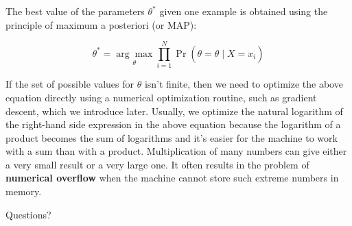 \documentclass[9pt,dvipsnames]{beamer}
\begin{document}
\begin{frame}
	The best value of the parameters $\theta^{*}$ given one example is obtained using the principle of maximum a posteriori (or MAP):

	$$
		\theta^{*}=\underset{\theta}{\arg \max } \prod_{i=1}^{N} \operatorname{Pr}\left(\theta=\hat{\theta} \mid X=x_{i}\right)
	$$

	If the set of possible values for $\theta$ isn't finite, then we need to optimize the above equation directly using a numerical optimization routine, such as gradient descent, which we introduce later. Usually, we optimize the natural logarithm of the right-hand side expression in the above equation because the logarithm of a product becomes the sum of logarithms and it's easier for the machine to work with a sum than with a product. Multiplication of many numbers can give either a very small result or a very large one. It often results in the problem of \textbf{numerical overflow} when the machine cannot store such extreme numbers in memory.
\end{frame}

\begin{frame}
	\begin{center}
		\Huge Questions?
	\end{center}
\end{frame}
\end{document}
